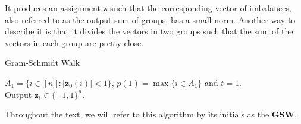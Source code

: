 \documentclass[12pt]{article}
\begin{document}
It produces an assignment $\textbf{z}$ such that the corresponding vector of imbalances, also referred to as the output sum of groups, has a small norm. Another way to describe it is that it divides the vectors in two groups such that the sum of the vectors in each group are pretty close.

\begin{algorithm}[H]\label{walk}
{\fontsize{10}{12}
\caption{Gram-Schmidt Walk \cite{blues}}
   $A_1=\{i\in[n]:|\textbf{z}_0(i)|<1\}$, $p(1) = \max \{i \in A_1\}$ and $t=1$.\\
    Output $\textbf{z}_t\in\{-1,1\}^n$.
    }%
    \end{algorithm}
Throughout the text, we will refer to this algorithm by its initials as the \textbf{GSW}.%
\end{document}

